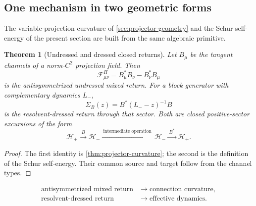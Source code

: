 \documentclass[11pt,reqno]{scrartcl}
\newcommand{\gaugeF}{\mathcal F}
\theoremstyle{plain}
\newtheorem{theorem}{Theorem}[section]
\theoremstyle{definition}
\theoremstyle{remark}
\begin{document}
\subsection{One mechanism in two geometric forms}

The variable-projection curvature of \cref{sec:projector-geometry} and the
Schur self-energy of the present section are built from the same algebraic
primitive.

\begin{theorem}[Undressed and dressed closed returns]
\label{thm:two-return-forms}
Let \(B_\mu\) be the tangent channels of a norm-\(C^2\) projection field.  Then
\begin{equation}
  \gaugeF_{\mu\nu}^{\Pi}
  =B_\mu^*B_\nu-B_\nu^*B_\mu
  \label{eq:undressed-return}
\end{equation}
is the antisymmetrized undressed mixed return.  For a block generator with
complementary dynamics \(L_-\),
\begin{equation}
  \Sigma_B(z)=B^*(L_--z)^{-1}B
  \label{eq:dressed-return}
\end{equation}
is the resolvent-dressed return through that sector.  Both are closed
positive-sector excursions of the form
\begin{equation}
  \mathscr H_+
  \xrightarrow{\ B\ }
  \mathscr H_-
  \xrightarrow{\ \text{intermediate operation}\ }
  \mathscr H_-
  \xrightarrow{\ B^*\ }
  \mathscr H_+.
  \label{eq:excursion-template}
\end{equation}
\end{theorem}

\begin{proof}
The first identity is \cref{thm:projector-curvature}; the second is the
definition of the Schur self-energy.  Their common source and target follow
from the channel types.
\end{proof}

\begin{equation}
  \boxed{
  \begin{aligned}
  \text{antisymmetrized mixed return}
  &\longrightarrow \text{connection curvature},\\
  \text{resolvent-dressed return}
  &\longrightarrow \text{effective dynamics}.
  \end{aligned}}
  \label{eq:pass3-summary}
\end{equation}


\end{document}
